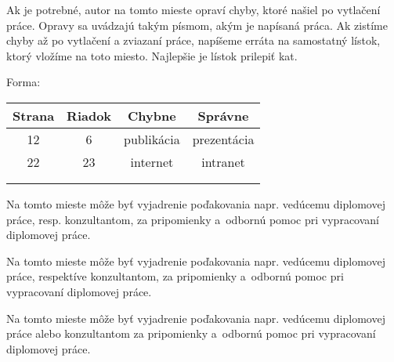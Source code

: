 \documentclass[a4paper]{tukediphc}
\begin{document}
\renewcommand\theHfigure{\theHsection.\arabic{figure}}
\renewcommand\theHtable{\theHsection.\arabic{table}}


\prvastrana

\titulnastrana


\errata %
Ak je potrebné, autor na tomto mieste opraví chyby, ktoré našiel po
vytlačení práce. Opravy sa uvádzajú takým písmom, akým je napísaná
práca. Ak zistíme chyby až po vytlačení a zviazaní práce, napíšeme
erráta na samostatný lístok, ktorý vložíme na toto miesto. Najlepšie je
lístok prilepiť\/ kat.

Forma:

\tabcolsep=10pt
\begin{table}[!hb]
	\centering
	\begin{tabular}{|c|c|c|c|}\hline
Strana & Riadok & Chybne & Správne \\\hline\hline
12 & 6 & publikácia & prezentácia \\\hline
22 & 23 & internet & intranet \\\hline
& & & \\\hline
& & & \\\hline
	\end{tabular}
\end{table}
\kerrata %

\abstraktsk %

\abstrakteng %

\kabstrakt %

\zadanieprace

\cestnevyhlasenie

\podakovanie
Na tomto mieste môže byť\/ vyjadrenie poďakovania napr. vedúcemu
diplomovej práce, resp. konzultantom, za pripomienky a~odbornú pomoc
pri vypracovaní diplomovej práce.

Na tomto mieste môže byť\/ vyjadrenie poďakovania napr. vedúcemu
diplomovej práce, respektíve konzultantom, za pripomienky a~odbornú
pomoc pri vypracovaní diplomovej práce.

Na tomto mieste môže byť\/ vyjadrenie poďakovania napr. vedúcemu
diplomovej práce alebo konzultantom za pripomienky a~odbornú pomoc pri
vypracovaní diplomovej práce.
\kpodakovania
\end{document}
